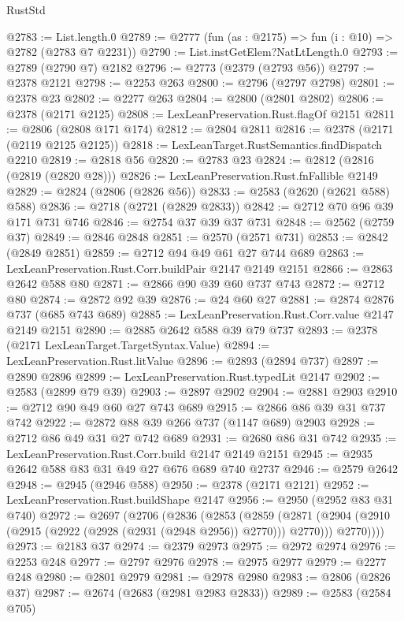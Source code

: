 \begin{lexlean}{RustStd}
\begin{coremodule}
{\begin{coremodule}
{{{{{{{{{{{{{{{@2783 := List.length.{0}
@2789 := @2777 (fun (as : @2175) => fun (i : @10) => @2782 (@2783 @7 @2231))
@2790 := List.instGetElem?NatLtLength.{0}
@2793 := @2789 (@2790 @7) @2182
@2796 := @2773 (@2379 (@2793 @56))
@2797 := @2378 @2121
@2798 := @2253 @263
@2800 := @2796 (@2797 @2798)
@2801 := @2378 @23
@2802 := @2277 @263
@2804 := @2800 (@2801 @2802)
@2806 := @2378 (@2171 @2125)
@2808 := LexLeanPreservation.Rust.flagOf @2151
@2811 := @2806 (@2808 @171 @174)
@2812 := @2804 @2811
@2816 := @2378 (@2171 (@2119 @2125 @2125))
@2818 := LexLeanTarget.RustSemantics.findDispatch @2210
@2819 := @2818 @56
@2820 := @2783 @23
@2824 := @2812 (@2816 (@2819 (@2820 @28)))
@2826 := LexLeanPreservation.Rust.fnFallible @2149
@2829 := @2824 (@2806 (@2826 @56))
@2833 := @2583 (@2620 (@2621 @588) @588)
@2836 := @2718 (@2721 (@2829 @2833))
@2842 := @2712 @70 @96 @39 @171 @731 @746
@2846 := @2754 @37 @39 @37 @731
@2848 := @2562 (@2759 @37)
@2849 := @2846 @2848
@2851 := @2570 (@2571 @731)
@2853 := @2842 (@2849 @2851)
@2859 := @2712 @94 @49 @61 @27 @744 @689
@2863 := LexLeanPreservation.Rust.Corr.buildPair @2147 @2149 @2151
@2866 := @2863 @2642 @588 @80
@2871 := @2866 @90 @39 @60 @737 @743
@2872 := @2712 @80
@2874 := @2872 @92 @39
@2876 := @24 @60 @27
@2881 := @2874 @2876 @737 (@685 @743 @689)
@2885 := LexLeanPreservation.Rust.Corr.value @2147 @2149 @2151
@2890 := @2885 @2642 @588 @39 @79 @737
@2893 := @2378 (@2171 LexLeanTarget.TargetSyntax.Value)
@2894 := LexLeanPreservation.Rust.litValue
@2896 := @2893 (@2894 @737)
@2897 := @2890 @2896
@2899 := LexLeanPreservation.Rust.typedLit @2147
@2902 := @2583 (@2899 @79 @39)
@2903 := @2897 @2902
@2904 := @2881 @2903
@2910 := @2712 @90 @49 @60 @27 @743 @689
@2915 := @2866 @86 @39 @31 @737 @742
@2922 := @2872 @88 @39 @266 @737 (@1147 @689) @2903
@2928 := @2712 @86 @49 @31 @27 @742 @689
@2931 := @2680 @86 @31 @742
@2935 := LexLeanPreservation.Rust.Corr.build @2147 @2149 @2151
@2945 := @2935 @2642 @588 @83 @31 @49 @27 @676 @689 @740 @2737
@2946 := @2579 @2642
@2948 := @2945 (@2946 @588)
@2950 := @2378 (@2171 @2121)
@2952 := LexLeanPreservation.Rust.buildShape @2147
@2956 := @2950 (@2952 @83 @31 @740)
@2972 := @2697
    (@2706
      (@2836
        (@2853
          (@2859
            (@2871 (@2904 (@2910 (@2915 (@2922 (@2928 (@2931 (@2948 @2956)) @2770))) @2770)))
            @2770))))
@2973 := @2183 @37
@2974 := @2379 @2973
@2975 := @2972 @2974
@2976 := @2253 @248
@2977 := @2797 @2976
@2978 := @2975 @2977
@2979 := @2277 @248
@2980 := @2801 @2979
@2981 := @2978 @2980
@2983 := @2806 (@2826 @37)
@2987 := @2674 (@2683 (@2981 @2983 @2833))
@2989 := @2583 (@2584 @705)
}}}}}}}}}}}}}}}
\end{coremodule}}
\end{coremodule}
\end{lexlean}

